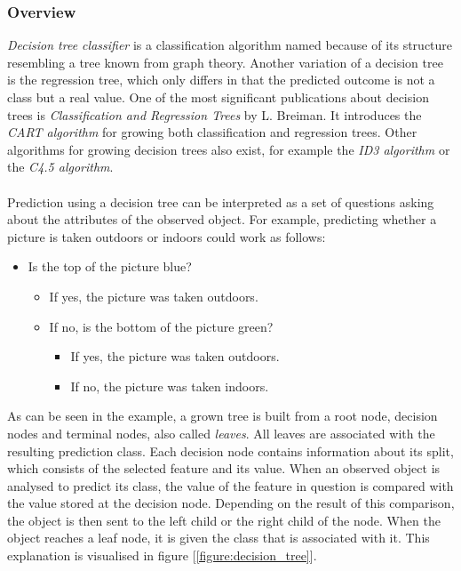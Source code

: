 \documentclass[11pt]{article}
\begin{document}
      \subsubsection{Overview}
        {\it Decision tree classifier} is a classification algorithm named because of its structure resembling a tree known from graph theory. Another variation of a decision tree is the regression tree, which only differs in that the predicted outcome is not a class but a real value. One of the most significant publications about decision trees is {\it Classification and Regression Trees} by L. Breiman. It introduces the {\it CART algorithm} for growing both classification and regression trees.\cite{cart} Other algorithms for growing decision trees also exist, for example the {\it ID3 algorithm} or the {\it C4.5 algorithm}.
        \\~\\
        Prediction using a decision tree can be interpreted as a set of questions asking about the attributes of the observed object. For example, predicting whether a picture is taken outdoors or indoors could work as follows:
        \begin{itemize}
          \item Is the top of the picture blue?
          \begin{itemize}
            \item If yes, the picture was taken outdoors.
            \item If no, is the bottom of the picture green?
            \begin{itemize}
              \item If yes, the picture was taken outdoors.
              \item If no, the picture was taken indoors.
            \end{itemize}
          \end{itemize}
        \end{itemize}
        As can be seen in the example, a grown tree is built from a root node, decision nodes and terminal nodes, also called {\it leaves}. All leaves are associated with the resulting prediction class. Each decision node contains information about its split, which consists of the selected feature and its value. When an observed object is analysed to predict its class, the value of the feature in question is compared with the value stored at the decision node. Depending on the result of this comparison, the object is then sent to the left child or the right child of the node. When the object reaches a leaf node, it is given the class that is associated with it. This explanation is visualised in figure [\ref{figure:decision_tree}].
\end{document}
